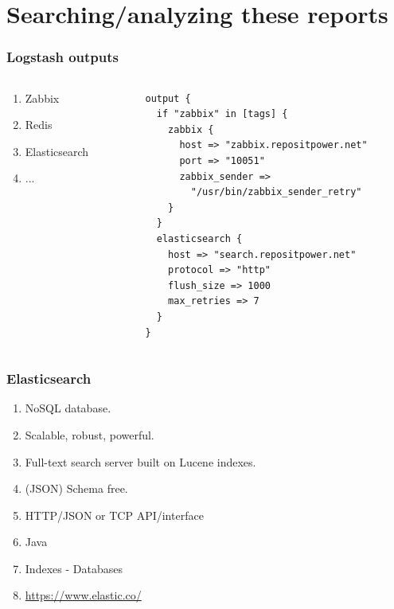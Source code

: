 \documentclass[13pt, ignorenonframetext]{beamer}
\begin{document}
\section{Searching/analyzing these reports}
\begin{frame}[fragile]
\frametitle{Logstash outputs}
      \begin{columns}[c] %
     \begin{column}{3.0cm} %
\begin{enumerate}
\item Zabbix
\item Redis
\item Elasticsearch
\item ...
\end{enumerate}
     \end{column}
     \begin{column}{6.0cm} %
\begin{lstlisting}[basicstyle=\scriptsize]
output {
  if "zabbix" in [tags] {
    zabbix {
      host => "zabbix.repositpower.net"
      port => "10051"
      zabbix_sender => 
        "/usr/bin/zabbix_sender_retry"
    }
  }
  elasticsearch {
    host => "search.repositpower.net"
    protocol => "http"
    flush_size => 1000
    max_retries => 7
  }
}
\end{lstlisting}
     \end{column}
     \end{columns}
\end{frame}


\begin{frame}
\frametitle{Elasticsearch}
\begin{enumerate}
\item NoSQL database.
\item Scalable, robust, powerful.
\item Full-text search server built on Lucene indexes.
\item (JSON) Schema free.
\item HTTP/JSON or TCP API/interface
\item Java
\item Indexes - Databases
\item \url{https://www.elastic.co/}
\end{enumerate}
\end{frame}
\end{document}
